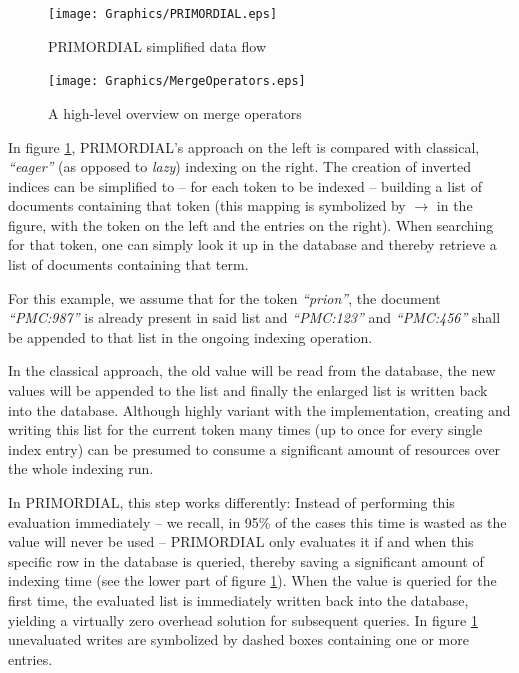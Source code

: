 \documentclass[a4paper, 12pt, twoside, reqn]{report}
\numberwithin{figure}{chapter}
\newtheorem[L]{boxedDefinition}{Definition}
\newtheorem[L]{boxedExample}{Example}
\newcommand{\itquote}[1]{\textit{{``}#1{''}}}
\begin{document}
\begin{figure}[!htb]
  \centering
  \texttt{[image: Graphics/PRIMORDIAL.eps]}
  \caption[PRIMORDIAL data flow]{PRIMORDIAL simplified data flow}
  \label{fig:primordial}
\end{figure}

\begin{figure}[!htb]
  \centering
  \texttt{[image: Graphics/MergeOperators.eps]}
  \caption[Merge operator overview]{A high-level overview on merge operators}
  \label{fig:merge-operators}
\end{figure}

In figure \ref{fig:primordial}, PRIMORDIAL's approach on the left is compared with classical, \itquote{eager} (as opposed to \textit{lazy}) indexing on the right. The creation of inverted indices can be simplified to -- for each token to be indexed -- building a list of documents containing that token (this mapping is symbolized by $\longrightarrow$ in the figure, with the token on the left and the entries on the right). When searching for that token, one can simply look it up in the database and thereby retrieve a list of documents containing that term.

For this example, we assume that for the token \itquote{prion}, the document \itquote{PMC:987} is already present in said list and \itquote{PMC:123} and \itquote{PMC:456} shall be appended to that list in the ongoing indexing operation.

In the classical approach, the old value will be read from the database, the new values will be appended to the list and finally the enlarged list is written back into the database. Although highly variant with the implementation, creating and writing this list for the current token many times (up to once for every single index entry) can be presumed to consume a significant amount of resources over the whole indexing run.

In PRIMORDIAL, this step works differently: Instead of performing this evaluation immediately -- we recall, in 95\% of the cases this time is wasted as the value will never be used -- PRIMORDIAL only evaluates it if and when this specific row in the database is queried, thereby saving a significant amount of indexing time (see the lower part of figure \ref{fig:primordial}). When the value is queried for the first time, the evaluated list is immediately written back into the database, yielding a virtually zero overhead solution for subsequent queries. In figure \ref{fig:primordial} unevaluated writes are symbolized by dashed boxes containing one or more entries.
\end{document}
